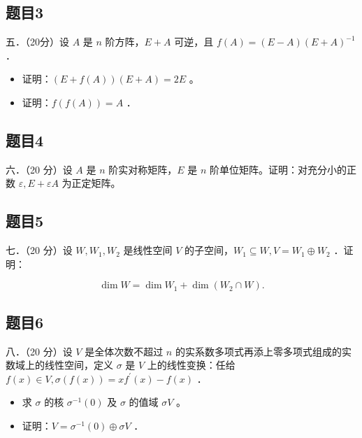 \documentclass{article}
\begin{document}
\subsection{题目3}
五．（20分）设 \(A\) 是 \(n\) 阶方阵，\(E+A\) 可逆，且 \(f(A)=(E-A)(E+A)^{-1}\) ．

\begin{itemize}
  \item[（1）] 证明：\((E+f(A))(E+A)=2 E\) 。
  \item[（2）] 证明：\(f(f(A))=A\) ．
\end{itemize}

\subsection{题目4}
六．（20 分）设 \(A\) 是 \(n\) 阶实对称矩阵，\(E\) 是 \(n\) 阶单位矩阵。证明：对充分小的正数 \(\varepsilon, E+\varepsilon A\) 为正定矩阵。

\subsection{题目5}
七．（20 分）设 \(W, W_{1}, W_{2}\) 是线性空间 \(V\) 的子空间，\(W_{1} \subseteq W, V=W_{1} \oplus W_{2}\) ．证明：

\[
\operatorname{dim} W=\operatorname{dim} W_{1}+\operatorname{dim}\left(W_{2} \cap W\right) .
\]

\subsection{题目6}
八．（20 分）设 \(V\) 是全体次数不超过 \(n\) 的实系数多项式再添上零多项式组成的实数域上的线性空间，定义 \(\sigma\) 是 \(V\) 上的线性变换：任给 \(f(x) \in V, \sigma(f(x))=x f^{\prime}(x)-f(x)\) ．

\begin{itemize}
  \item[（1）] 求 \(\sigma\) 的核 \(\sigma^{-1}(0)\) 及 \(\sigma\) 的值域 \(\sigma V\) 。
  \item[（2）] 证明：\(V=\sigma^{-1}(0) \oplus \sigma V\) ．
\end{itemize}
\end{document}
